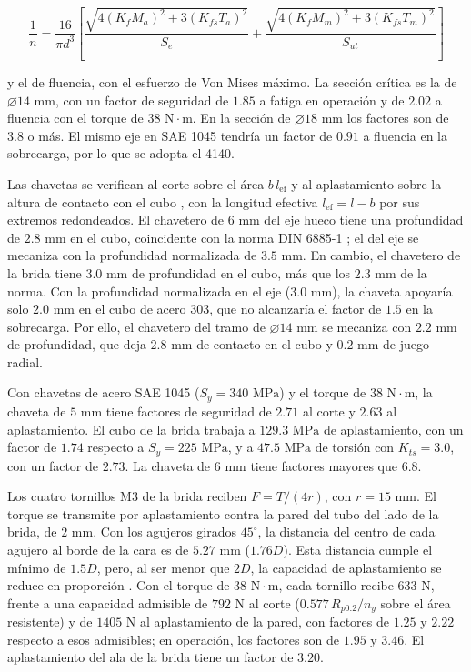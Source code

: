 \documentclass[../../General.tex]{subfiles}
\begin{document}
\begin{equation}\label{eq:goodman_elev}
    \frac{1}{n} = \frac{16}{\pi d^3}\left[\frac{\sqrt{4\left(K_f M_a\right)^2 + 3\left(K_{fs} T_a\right)^2}}{S_e} + \frac{\sqrt{4\left(K_f M_m\right)^2 + 3\left(K_{fs} T_m\right)^2}}{S_{ut}}\right]
\end{equation}

y el de fluencia, con el esfuerzo de Von Mises máximo. La sección crítica es la de $\varnothing 14\text{ mm}$, con un factor de seguridad de $1.85$ a fatiga en operación y de $2.02$ a fluencia con el torque de $38\text{ N}\cdot\text{m}$. En la sección de $\varnothing 18\text{ mm}$ los factores son de $3.8$ o más. El mismo eje en SAE 1045 tendría un factor de $0.91$ a fluencia en la sobrecarga, por lo que se adopta el 4140.

Las chavetas se verifican al corte sobre el área $b\,l_{\text{ef}}$ y al aplastamiento sobre la altura de contacto con el cubo \citep{Shigley11th}, con la longitud efectiva $l_{\text{ef}} = l - b$ por sus extremos redondeados. El chavetero de $6\text{ mm}$ del eje hueco tiene una profundidad de $2.8\text{ mm}$ en el cubo, coincidente con la norma DIN 6885-1 \citep{din6885_1}; el del eje se mecaniza con la profundidad normalizada de $3.5\text{ mm}$. En cambio, el chavetero de la brida tiene $3.0\text{ mm}$ de profundidad en el cubo, más que los $2.3\text{ mm}$ de la norma. Con la profundidad normalizada en el eje ($3.0\text{ mm}$), la chaveta apoyaría solo $2.0\text{ mm}$ en el cubo de acero 303, que no alcanzaría el factor de $1.5$ en la sobrecarga. Por ello, el chavetero del tramo de $\varnothing 14\text{ mm}$ se mecaniza con $2.2\text{ mm}$ de profundidad, que deja $2.8\text{ mm}$ de contacto en el cubo y $0.2\text{ mm}$ de juego radial.

Con chavetas de acero SAE 1045 ($S_y = 340\text{ MPa}$) y el torque de $38\text{ N}\cdot\text{m}$, la chaveta de $5\text{ mm}$ tiene factores de seguridad de $2.71$ al corte y $2.63$ al aplastamiento. El cubo de la brida trabaja a $129.3\text{ MPa}$ de aplastamiento, con un factor de $1.74$ respecto a $S_y = 225\text{ MPa}$, y a $47.5\text{ MPa}$ de torsión con $K_{ts} = 3.0$, con un factor de $2.73$. La chaveta de $6\text{ mm}$ tiene factores mayores que $6.8$.

Los cuatro tornillos M3 de la brida reciben $F = T/(4r)$, con $r = 15\text{ mm}$. El torque se transmite por aplastamiento contra la pared del tubo del lado de la brida, de $2\text{ mm}$. Con los agujeros girados $45^\circ$, la distancia del centro de cada agujero al borde de la cara es de $5.27\text{ mm}$ ($1.76D$). Esta distancia cumple el mínimo de $1.5D$, pero, al ser menor que $2D$, la capacidad de aplastamiento se reduce en proporción \citep{aluminum2005manual}. Con el torque de $38\text{ N}\cdot\text{m}$, cada tornillo recibe $633\text{ N}$, frente a una capacidad admisible de $792\text{ N}$ al corte ($0.577\,R_{p0.2}/n_y$ sobre el área resistente) y de $1405\text{ N}$ al aplastamiento de la pared, con factores de $1.25$ y $2.22$ respecto a esos admisibles; en operación, los factores son de $1.95$ y $3.46$. El aplastamiento del ala de la brida tiene un factor de $3.20$.
\end{document}
